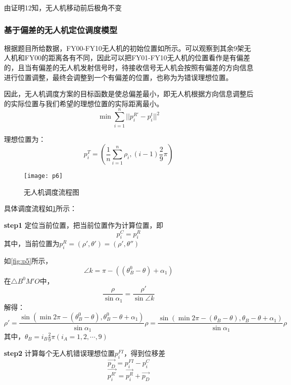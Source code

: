 \documentclass{cumcmthesis}
\begin{document}
由证明12知，无人机移动前后极角不变
\subsubsection{基于偏差的无人机定位调度模型}


根据题目所给数据，FY00-FY10无人机的初始位置如所示。可以观察到其余9架无人机和FY00的距离各有不同，因此可以把FY01-FY10无人机的位置看作是有偏差的，且当有偏差的无人机发射信号时，待接收信号无人机会按照有偏差的方向信息进行位置调整，最终会调整到一个有偏差的位置，也称为为错误理想位置。

因此，无人机调度方案的目标函数是使总偏差最小，即无人机根据方向信息调整后的实际位置与我们希望的理想位置的实际距离最小。
\begin{equation}
	\min \sum_{i=1}^{n} || p_i^{R'} - p_i^t||^2
	\label{eq:22}
\end{equation}

理想位置为：
\begin{equation}
	p_i^T=(\frac{1}{n} \sum_{i=1}^{n}    \rho_i,(i-1)\frac{2}{9} \pi)
	\label{eq:23}
\end{equation}
\begin{figure}[!h]
	\centering
	\texttt{[image: p6]}
	\caption{无人机调度流程图}
	\label{fig:p6}
\end{figure}
具体调度流程如\cref{fig:p6}所示：



\textbf{step1} 定位当前位置，把当前位置作为计算位置，即
\begin{equation}
	p_i^C=p_i^R
	\label{eq:24}
\end{equation}
其中，当前位置为$p_i^R=(\rho',\theta')=(\rho',\theta'')$

如\cref{fig:p5}所示，
\[\angle k= \pi - ((\theta_B^0- \theta)+ \alpha_{1})\]
在$\triangle B^0M'O$中，
\[\frac{\rho}{\sin \alpha_1}=\frac{\rho'}{\sin \angle k} \]
解得：
\begin{equation}
	\rho'=\frac{\sin(\min{2\pi-(\theta_B^0-\theta),\theta_B^0-\theta}+ \alpha_1)}{\sin \alpha_1} \rho=\frac{\sin(\min{2\pi-(\theta_B-\theta),\theta_B-\theta}+ \alpha_1)}{\sin \alpha_1} \rho
	\label{eq:25}
\end{equation}
其中，$\theta_{B}=i_B \frac{2}{9}\pi (i_A=1,2,\cdots,9)$

\textbf{step2} 计算每个无人机错误理想位置$p_i^{FI}$，得到位移差
\begin{equation}
	\vec{p_D}=p_i^{FI}-p_i^C
	\label{eq:26}
\end{equation}
\begin{equation}
	\vec{p_i^{R'}}=	\vec{p_i^R}+\vec{p_D}
	\label{eq:27}
\end{equation}
\end{document}
